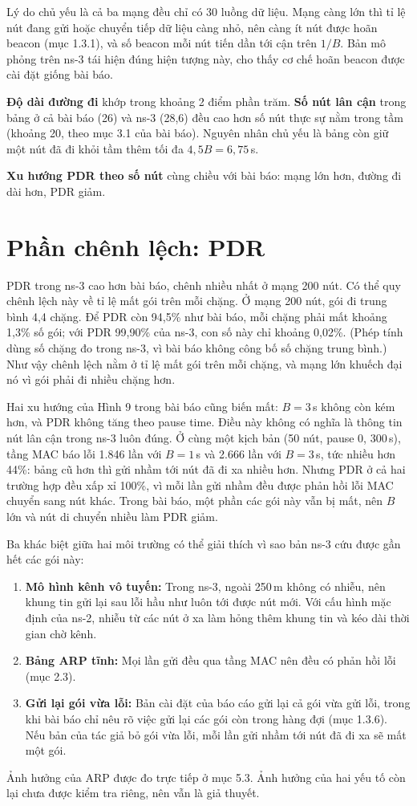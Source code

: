 \documentclass[a4paper,13pt]{extreport}
\begin{document}
Lý do chủ yếu là cả ba mạng đều chỉ có 30 luồng dữ liệu. Mạng càng lớn thì tỉ lệ nút đang gửi hoặc chuyển tiếp dữ liệu càng nhỏ, nên càng ít nút được hoãn beacon (mục 1.3.1), và số beacon mỗi nút tiến dần tới cận trên $1/B$. Bản mô phỏng trên ns-3 tái hiện đúng hiện tượng này, cho thấy cơ chế hoãn beacon được cài đặt giống bài báo.

\textbf{Độ dài đường đi} khớp trong khoảng 2 điểm phần trăm. \textbf{Số nút lân cận} trong bảng ở cả bài báo (26) và ns-3 (28,6) đều cao hơn số nút thực sự nằm trong tầm (khoảng 20, theo mục 3.1 của bài báo). Nguyên nhân chủ yếu là bảng còn giữ một nút đã đi khỏi tầm thêm tối đa $4{,}5B = 6{,}75$\,s.

\textbf{Xu hướng PDR theo số nút} cùng chiều với bài báo: mạng lớn hơn, đường đi dài hơn, PDR giảm.

\section{Phần chênh lệch: PDR}

PDR trong ns-3 cao hơn bài báo, chênh nhiều nhất ở mạng 200 nút. Có thể quy chênh lệch này về tỉ lệ mất gói trên mỗi chặng. Ở mạng 200 nút, gói đi trung bình 4,4 chặng. Để PDR còn 94,5\% như bài báo, mỗi chặng phải mất khoảng 1,3\% số gói; với PDR 99,90\% của ns-3, con số này chỉ khoảng 0,02\%. (Phép tính dùng số chặng đo trong ns-3, vì bài báo không công bố số chặng trung bình.) Như vậy chênh lệch nằm ở tỉ lệ mất gói trên mỗi chặng, và mạng lớn khuếch đại nó vì gói phải đi nhiều chặng hơn.

Hai xu hướng của Hình 9 trong bài báo cũng biến mất: $B = 3$\,s không còn kém hơn, và PDR không tăng theo pause time. Điều này không có nghĩa là thông tin nút lân cận trong ns-3 luôn đúng. Ở cùng một kịch bản (50 nút, pause 0, 300\,s), tầng MAC báo lỗi 1.846 lần với $B = 1$\,s và 2.666 lần với $B = 3$\,s, tức nhiều hơn 44\%: bảng cũ hơn thì gửi nhầm tới nút đã đi xa nhiều hơn. Nhưng PDR ở cả hai trường hợp đều xấp xỉ 100\%, vì mỗi lần gửi nhầm đều được phản hồi lỗi MAC chuyển sang nút khác. Trong bài báo, một phần các gói này vẫn bị mất, nên $B$ lớn và nút di chuyển nhiều làm PDR giảm.

Ba khác biệt giữa hai môi trường có thể giải thích vì sao bản ns-3 cứu được gần hết các gói này:
\begin{enumerate}[leftmargin=1.6cm]
  \item \textbf{Mô hình kênh vô tuyến:} Trong ns-3, ngoài 250\,m không có nhiễu, nên khung tin gửi lại sau lỗi hầu như luôn tới được nút mới. Với cấu hình mặc định của ns-2, nhiễu từ các nút ở xa làm hỏng thêm khung tin và kéo dài thời gian chờ kênh.
  \item \textbf{Bảng ARP tĩnh:} Mọi lần gửi đều qua tầng MAC nên đều có phản hồi lỗi (mục 2.3).
  \item \textbf{Gửi lại gói vừa lỗi:} Bản cài đặt của báo cáo gửi lại cả gói vừa gửi lỗi, trong khi bài báo chỉ nêu rõ việc gửi lại các gói còn trong hàng đợi (mục 1.3.6). Nếu bản của tác giả bỏ gói vừa lỗi, mỗi lần gửi nhầm tới nút đã đi xa sẽ mất một gói.
\end{enumerate}
Ảnh hưởng của ARP được đo trực tiếp ở mục 5.3. Ảnh hưởng của hai yếu tố còn lại chưa được kiểm tra riêng, nên vẫn là giả thuyết.
\end{document}
